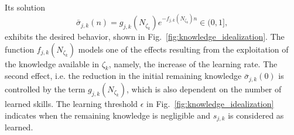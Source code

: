 \documentclass[12pt]{article}
\begin{document}
\noindent Its solution
\begin{equation}\label{eq:knowledge_exponential_form}
	\bar{\sigma}_{j,k}(n) = g_{j,k}\left(N_{\zeta_k}\right) e ^{-f_{j,k}\left(N_{\zeta_k}\right) n} \in (0,1],
\end{equation}
exhibits the desired behavior, shown in Fig.~\ref{fig:knowledge_idealization}. The function $f_{j,k}\left(N_{\zeta_k}\right)$ models one of the effects resulting from the exploitation of the knowledge available in $\zeta_k$, namely, the increase of the learning rate. The second effect, i.e. the reduction in the initial remaining knowledge $\bar{\sigma}_{j,k}(0)$ is controlled by the term $g_{j,k}\left(N_{\zeta_k}\right)$, which is also dependent on the number of learned skills. The learning threshold $\epsilon$ in Fig.~\ref{fig:knowledge_idealization} indicates when the remaining knowledge is negligible and $s_{j,k}$ is considered as learned.

\end{document}
